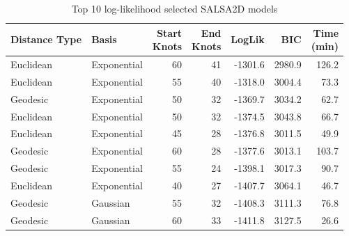\begin{table}[!htb]
\begin{tabular}{|l|l|r|r|r|r|r|}
\hline
Distance Type & Basis & \makecell[r]{Start \\Knots} & \makecell[l]{End \\Knots} & LogLik & BIC & \makecell[l]{Time \\(min)}\\
\hline
Euclidean & Exponential & 60 & 41 & -1301.6 & 2980.9 & 126.2\\
\hline
Euclidean & Exponential & 55 & 40 & -1318.0 & 3004.4 & 73.3\\
\hline
Geodesic & Exponential & 50 & 32 & -1369.7 & 3034.2 & 62.7\\
\hline
Euclidean & Exponential & 50 & 32 & -1374.5 & 3043.8 & 66.7\\
\hline
Euclidean & Exponential & 45 & 28 & -1376.8 & 3011.5 & 49.9\\
\hline
Geodesic & Exponential & 60 & 28 & -1377.6 & 3013.1 & 103.7\\
\hline
Geodesic & Exponential & 55 & 24 & -1398.1 & 3017.3 & 90.7\\
\hline
Euclidean & Exponential & 40 & 27 & -1407.7 & 3064.1 & 46.7\\
\hline
Geodesic & Gaussian & 55 & 32 & -1408.3 & 3111.3 & 76.8\\
\hline
Geodesic & Gaussian & 60 & 33 & -1411.8 & 3127.5 & 26.6\\
\hline
\end{tabular}
\caption{Top 10 log-likelihood selected SALSA2D models}
\end{table}

